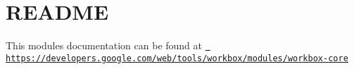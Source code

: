 \chapter{README}
\hypertarget{md_pkiclassroomrescheduler_2src_2main_2frontend_2node__modules_2workbox-core_2_r_e_a_d_m_e}{}\label{md_pkiclassroomrescheduler_2src_2main_2frontend_2node__modules_2workbox-core_2_r_e_a_d_m_e}
This module\textquotesingle{}s documentation can be found at \href{https://developers.google.com/web/tools/workbox/modules/workbox-core}{\texttt{ https\+://developers.\+google.\+com/web/tools/workbox/modules/workbox-\/core}} 